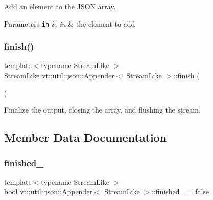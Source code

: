 Add an element to the J\+S\+ON array. 


\begin{DoxyParams}[1]{Parameters}
\mbox{\tt in}  & {\em in} & the element to add \\
\hline
\end{DoxyParams}
\mbox{\label{structvt_1_1util_1_1json_1_1_appender_ab56d332c2a9c5f051d58dbec6803b780}} 
\subsubsection{\texorpdfstring{finish()}{finish()}}
{\footnotesize\ttfamily template$<$typename Stream\+Like $>$ \\
Stream\+Like \hyperlink{structvt_1_1util_1_1json_1_1_appender}{vt\+::util\+::json\+::\+Appender}$<$ Stream\+Like $>$\+::finish (\begin{DoxyParamCaption}{ }\end{DoxyParamCaption})\hspace{0.3cm}{\ttfamily [inline]}}



Finalize the output, closing the array, and flushing the stream. 



\subsection{Member Data Documentation}
\mbox{\label{structvt_1_1util_1_1json_1_1_appender_aa34d4af41777c8f610e9c93b03a034de}} 
\subsubsection{\texorpdfstring{finished\+\_\+}{finished\_}}
{\footnotesize\ttfamily template$<$typename Stream\+Like $>$ \\
bool \hyperlink{structvt_1_1util_1_1json_1_1_appender}{vt\+::util\+::json\+::\+Appender}$<$ Stream\+Like $>$\+::finished\+\_\+ = false\hspace{0.3cm}{\ttfamily [private]}}

